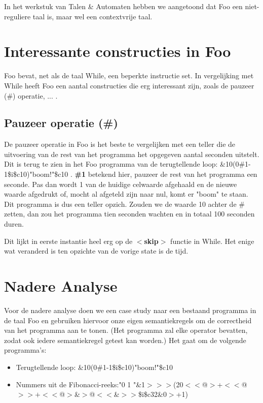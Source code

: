 \documentclass[11pt]{article}
\begin{document}
In het werkstuk van Talen \& Automaten hebben we aangetoond dat Foo een niet-reguliere taal is, maar wel een contextvrije taal.

\section{Interessante constructies in Foo}

Foo bevat, net als de taal While, een beperkte instructie set. 
In vergelijking met While heeft Foo een aantal constructies die erg interessant zijn, zoals de pauzeer (\#) operatie, ... . 

\subsection{Pauzeer operatie (\#)}
De pauzeer operatie in Foo is het beste te vergelijken met een teller die de uitvoering van de rest van het programma het opgegeven aantal seconden uitstelt. 
Dit is terug te zien in het Foo programma van de terugtellende loop: \&10(0\#1-1\$i\$c10)"boom!"\$c10 .
{\bf \#1} betekend hier, pauzeer de rest van het programma een seconde. 
Pas dan wordt 1 van de huidige celwaarde afgehaald en de nieuwe waarde afgedrukt of, mocht al afgeteld zijn naar nul, komt er "boom" te staan.
Dit programma is dus een teller opzich.
Zouden we de waarde 10 achter de \# zetten, dan zou het programma tien seconden wachten en in totaal 100 seconden duren.


Dit lijkt in eerste instantie heel erg op de {\bf\(<\)skip\(>\)} functie in While.
Het enige wat veranderd is ten opzichte van de vorige state is de tijd.







\section{Nadere Analyse}

Voor de nadere analyse doen we een case study naar een bestaand programma in de taal Foo en gebruiken hiervoor onze eigen semantiekregels om de correctheid van het programma aan te tonen. 
(Het programma zal elke operator bevatten, zodat ook iedere semantiekregel getest kan worden.)
 Het gaat om de volgende programma's:

\begin{itemize}
\item Terugtellende loop: \&10(0\#1-1\$i\$c10)"boom!"\$c10
\item Nummers uit de Fibonacci-reeks:\newline "0 1 "\&1\(>>>\)(20\(<<\)@\(>\)+\(<<\)@\(>>+<<\)@\(>\)\&\(>\)@\(<<\)\&\(>>\)\$i\$c32\&0\(>\)+1)
\end{itemize}
\end{document}
